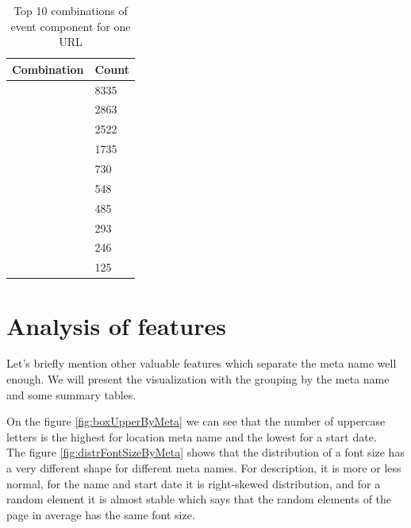 \begin{table}
\begin{center}
{\renewcommand{\arraystretch}{1.5}
\begin{tabular}{| p{8cm} | p{2cm}|}
\hline
\textbf{Combination}    &    \textbf{Count}\\
\hline
['name']    &    8335\\
\hline
['location', 'name']    &    2863\\
\hline
['name', 'startDate']    &    2522\\
\hline
['location', 'name', 'startDate']    &    1735\\
\hline
['description', 'name']    &    730\\
\hline
['description', 'name', 'startDate']    &    548\\
\hline
['description', 'location', 'name']    &    485\\
\hline
['description', 'location', 'name', 'startDate']    &    293\\
\hline
['name', 'startDate', 'startDate']    &    246\\
\hline
['location', 'name', 'startDate', 'startDate']    &    125\\
\hline
\end{tabular}}
\caption{Top 10 combinations of event component for one URL}
\label{table:top10comb}
\end{center}
\end{table}    

\section{Analysis of features}
Let's briefly mention other valuable features which separate the meta name well enough. We will present the visualization with the grouping by the meta name and some summary tables.

On the figure \ref{fig:boxUpperByMeta} we can see that the number of uppercase letters is the highest for location meta name and the lowest for a start date.\\

The figure \ref{fig:distrFontSizeByMeta} shows that the distribution of a font size has a very different shape for different meta names. For description, it is more or less normal, for the name and start date it is right-skewed distribution, and for a random element it is almost stable which says that the random elements of the page in average has the same font size.\\   

